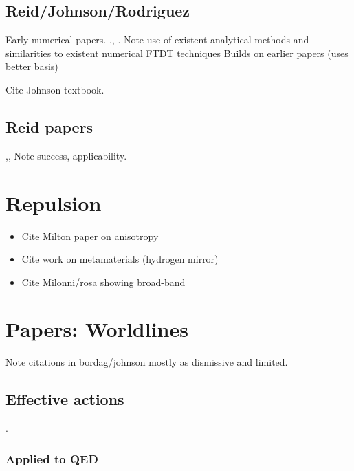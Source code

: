 \subsection{Reid/Johnson/Rodriguez}

Early numerical papers.
\cite{Rodriguez2007},\cite{Rodriguez2007a}, \cite{Rodriguez2009}.
  Note use of existent analytical methods and similarities to existent numerical 
FTDT techniques Builds on earlier papers (uses better basis) 

Cite Johnson textbook.\cite{Johnson2011}

\subsection{Reid papers}

\cite{Reid2009},\cite{Reid2011}, \cite{Reid2013} 
Note success, applicability.  

\section{Repulsion}

\begin{itemize}
\item Cite Milton paper on anisotropy \cite{Milton2012, Milton2012a}
\item Cite work on metamaterials (hydrogen mirror)
\item Cite Milonni/rosa showing broad-band \cite{Rosa2010}
\end{itemize}

\section{Papers: Worldlines}

Note citations in bordag/johnson mostly as dismissive and limited.  

\subsection{Effective actions}

\cite{McKeon1993, Strassler1992,Schubert2001}



\cite{Schubert2001}.  

\subsubsection{Applied to QED}

